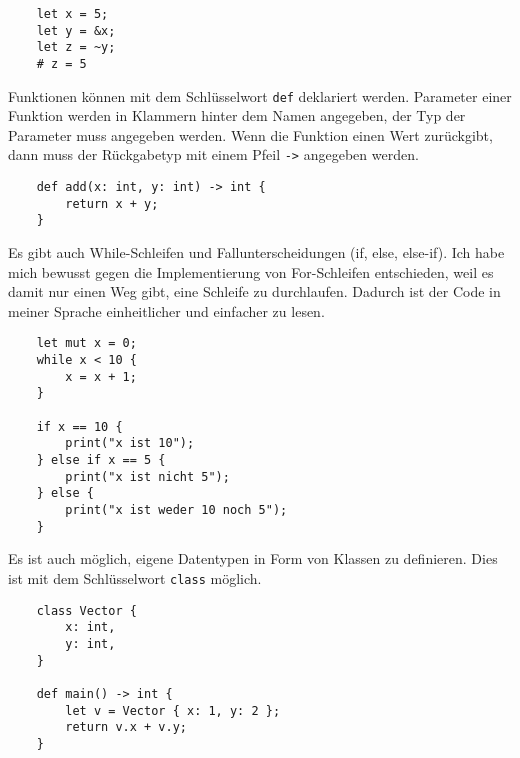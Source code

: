         \begin{lstlisting}
    let x = 5;
    let y = &x;
    let z = ~y;
    # z = 5
        \end{lstlisting}
    

        Funktionen können mit dem Schlüsselwort \texttt{def} deklariert werden. Parameter einer Funktion
        werden in Klammern hinter dem Namen angegeben, der Typ der Parameter muss angegeben werden. Wenn die 
        Funktion einen Wert zurückgibt, dann muss der Rückgabetyp mit einem Pfeil \texttt{->} angegeben werden.


        \begin{lstlisting}
    def add(x: int, y: int) -> int {
        return x + y;
    }
        \end{lstlisting}

        Es gibt auch While-Schleifen und Fallunterscheidungen (if, else, else-if).
        Ich habe mich bewusst gegen die Implementierung von For-Schleifen entschieden, weil es damit nur einen 
        Weg gibt, eine Schleife zu durchlaufen. Dadurch ist der Code in meiner Sprache einheitlicher 
        und einfacher zu lesen.

        \begin{lstlisting}
    let mut x = 0;
    while x < 10 {
        x = x + 1;
    }

    if x == 10 {
        print("x ist 10");
    } else if x == 5 {
        print("x ist nicht 5");
    } else {
        print("x ist weder 10 noch 5");
    }
        \end{lstlisting}
        \newpage
        Es ist auch möglich, eigene Datentypen in Form von Klassen zu definieren. Dies ist mit dem Schlüsselwort
        \texttt{class} möglich.


        \begin{lstlisting}
    class Vector {
        x: int,
        y: int,
    }

    def main() -> int {
        let v = Vector { x: 1, y: 2 };
        return v.x + v.y;
    }
        \end{lstlisting}


        

